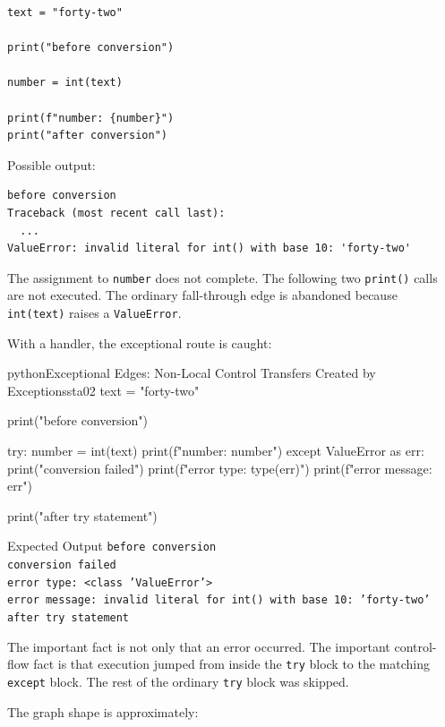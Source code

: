 \documentclass[a4paper,twoside]{report}
\begin{document}
\begin{verbatim}
text = "forty-two"

print("before conversion")

number = int(text)

print(f"number: {number}")
print("after conversion")
\end{verbatim}

Possible output:

\begin{verbatim}
before conversion
Traceback (most recent call last):
  ...
ValueError: invalid literal for int() with base 10: 'forty-two'
\end{verbatim}

The assignment to \texttt{number} does not complete. The following two \texttt{print()} calls are not executed. The ordinary fall-through edge is abandoned because \texttt{int(text)} raises a \texttt{ValueError}.

With a handler, the exceptional route is caught:

\begin{codebox}[]{python}{Exceptional Edges: Non-Local Control Transfers Created by Exceptions}{sta02}
text = "forty-two"

print("before conversion")

try:
    number = int(text)
    print(f"number: {number}")
except ValueError as err:
    print("conversion failed")
    print(f"error type: {type(err)}")
    print(f"error message: {err}")

print("after try statement")
\end{codebox}


\begin{iobox}{Expected Output}
\texttt{before conversion} \\
\texttt{conversion failed} \\
\texttt{error type: <class 'ValueError'>} \\
\texttt{error message: invalid literal for int() with base 10: 'forty-two'} \\
\texttt{after try statement} \\
\end{iobox}


The important fact is not only that an error occurred. The important control-flow fact is that execution jumped from inside the \texttt{try} block to the matching \texttt{except} block. The rest of the ordinary \texttt{try} block was skipped.

The graph shape is approximately:
\end{document}
